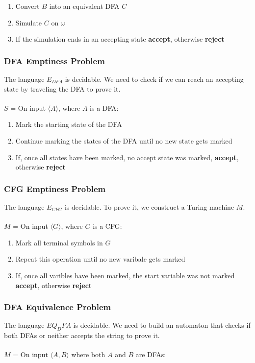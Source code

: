 \documentclass{article}
\begin{document}
\begin{enumerate}
	\item Convert $B$ into an equivalent DFA $C$
	\item Simulate $C$ on $\omega$
	\item If the simulation ends in an accepting state \textbf{accept}, otherwise \textbf{reject}
\end{enumerate}

\subsubsection{DFA Emptiness Problem}
The language $E_{DFA}$ is decidable. We need to check if we can reach an accepting state by traveling the DFA to prove it. \\ \\
$S$ = On input $\langle A \rangle$, where $A$ is a DFA:

\begin{enumerate}
	\item Mark the starting state of the DFA
	\item Continue marking the states of the DFA until no new state gets marked
	\item If, once all states have been marked, no accept state was marked, \textbf{accept}, otherwise \textbf{reject}
\end{enumerate}

\subsubsection{CFG Emptiness Problem}
The language $E_{CFG}$ is decidable. To prove it, we construct a Turing machine $M$. \\ \\
$M$ = On input $\langle G \rangle$, where $G$ is a CFG:

\begin{enumerate}
	\item Mark all terminal symbols in $G$
	\item Repeat this operation until no new varibale gets marked
	\item If, once all varibles have been marked, the start variable was not marked \textbf{accept}, otherwise \textbf{reject}
\end{enumerate}

\subsubsection{DFA Equivalence Problem}
The language $EQ_DFA$ is decidable. We need to build an automaton that checks if both DFAs or neither accepts the string to prove it. \\ \\
$M$ = On input $\langle A, B \rangle$ where both $A$ and $B$ are DFAs:
\end{document}

